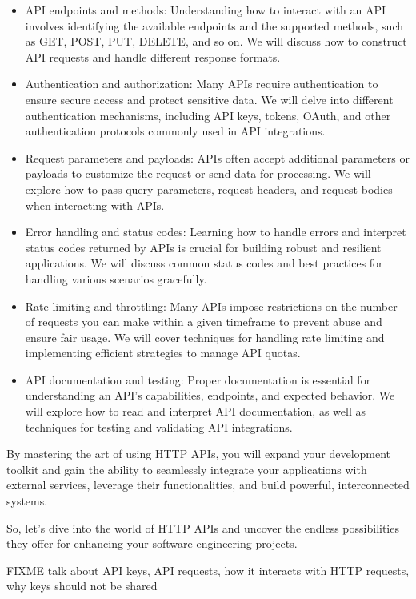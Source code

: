 \begin{itemize}
\item API endpoints and methods: Understanding how to interact with an
  API involves identifying the available endpoints and the supported
  methods, such as GET, POST, PUT, DELETE, and so on. We will discuss how to
  construct API requests and handle different response formats.

\item Authentication and authorization: Many APIs require
  authentication to ensure secure access and protect sensitive
  data. We will delve into different authentication mechanisms,
  including API keys, tokens, OAuth, and other authentication
  protocols commonly used in API integrations.

\item Request parameters and payloads: APIs often accept additional
  parameters or payloads to customize the request or send data for
  processing. We will explore how to pass query parameters, request
  headers, and request bodies when interacting with APIs.

\item Error handling and status codes: Learning how to handle errors
  and interpret status codes returned by APIs is crucial for building
  robust and resilient applications. We will discuss common status
  codes and best practices for handling various scenarios gracefully.

\item Rate limiting and throttling: Many APIs impose restrictions on
  the number of requests you can make within a given timeframe to
  prevent abuse and ensure fair usage. We will cover techniques for
  handling rate limiting and implementing efficient strategies to
  manage API quotas.

\item API documentation and testing: Proper documentation is essential
  for understanding an API's capabilities, endpoints, and expected
  behavior. We will explore how to read and interpret API
  documentation, as well as techniques for testing and validating API
  integrations.
\end{itemize}

By mastering the art of using HTTP APIs, you will expand your
development toolkit and gain the ability to seamlessly integrate your
applications with external services, leverage their functionalities,
and build powerful, interconnected systems.

So, let's dive into the world of HTTP APIs and uncover the endless
possibilities they offer for enhancing your software engineering
projects.

FIXME talk about API keys, API requests, how it interacts with HTTP requests, why keys should not be shared
